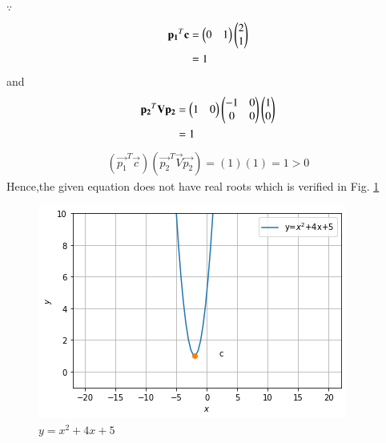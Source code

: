     $\because $
    \begin{align}
        \mathbf{p_1}^T\mathbf{c} &= \begin{pmatrix}0 & 1\end{pmatrix}\begin{pmatrix}2 \\ 1\end{pmatrix}
        \\
        &= 1
    \end{align}
    and
    \begin{align}
        \mathbf{p_2}^T\mathbf{V}\mathbf{p_2} &= \begin{pmatrix}1 & 0\end{pmatrix}\begin{pmatrix}-1 & 0\\0& 0\end{pmatrix}\begin{pmatrix}1 \\ 0\end{pmatrix}
        \\
        &= 1
    \end{align}
    \begin{align}
        (\vec{p_1}^T\vec{c})(\vec{p_2}^T\vec{V}\vec{p_2}) = (1)(1) = 1>0
        \end{align}
        Hence,the given equation does not have real roots which is verified in Fig.     \ref{quad/2/23/ex4}	
    \begin{figure}[!ht]
    \centering
    \includegraphics[width=\columnwidth]{solutions/su2021/2/23/figure5(2).png}
    \caption{$y=x^2+4x+5$}
    \label{quad/2/23/ex4}	
    \end{figure}
    
   
   
   
   